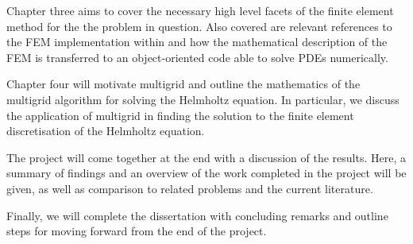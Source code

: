 Chapter three aims to cover the necessary high level facets of the finite element method for the the problem in question.
Also covered are relevant references to the FEM implementation within \oomph and how the mathematical description of the FEM is transferred to an object-oriented code able to solve PDEs numerically.

Chapter four will motivate multigrid and outline the mathematics of the multigrid algorithm for solving the Helmholtz equation.
In particular, we discuss the application of multigrid in finding the solution to the finite element discretisation of the Helmholtz equation.

The project will come together at the end with a discussion of the results.
Here, a summary of findings and an overview of the work completed in the project will be given, as well as comparison to related problems and the current literature.

Finally, we will complete the dissertation with concluding remarks and outline steps for moving forward from the end of the project.